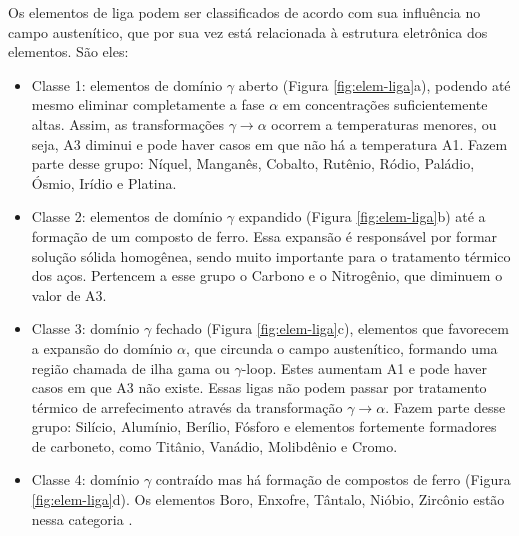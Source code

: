 \documentclass[brazil,tf,epusp]{usp}  %
\begin{document}

Os elementos de liga podem ser classificados de acordo com sua influência no campo austenítico, que por sua vez está relacionada à estrutura eletrônica dos elementos. São eles:

\begin{itemize}
  \item Classe 1: elementos de domínio $\gamma$ aberto (Figura \ref{fig:elem-liga}a), podendo até mesmo eliminar completamente a fase $\alpha$ em concentrações suficientemente altas. Assim, as transformações $\gamma \rightarrow  \alpha$ ocorrem a temperaturas menores, ou seja, A3 diminui e pode haver casos em que não há a temperatura A1. Fazem parte desse grupo: Níquel, Manganês, Cobalto, Rutênio, Ródio, Paládio, Ósmio, Irídio e Platina.

  \item Classe 2: elementos de domínio $\gamma$ expandido (Figura \ref{fig:elem-liga}b) até a formação de um composto de ferro. Essa expansão é responsável por formar solução sólida homogênea, sendo muito importante para o tratamento térmico dos aços. Pertencem a esse grupo o Carbono e o Nitrogênio, que diminuem o valor de A3.

  \item Classe 3: domínio $\gamma$ fechado (Figura \ref{fig:elem-liga}c), elementos que favorecem a expansão do domínio $\alpha$, que circunda o campo austenítico, formando uma região chamada de ilha gama ou $\gamma$-loop. Estes aumentam A1 e pode haver casos em que A3 não existe. Essas ligas não podem passar por tratamento térmico de arrefecimento através da transformação $\gamma \rightarrow \alpha$. Fazem parte desse grupo: Silício, Alumínio, Berílio, Fósforo e elementos fortemente formadores de carboneto, como Titânio, Vanádio, Molibdênio e Cromo.

  \item Classe 4: domínio $\gamma$ contraído mas há formação de compostos de ferro (Figura \ref{fig:elem-liga}d). Os elementos Boro, Enxofre, Tântalo, Nióbio, Zircônio estão nessa categoria \cite{Honeycombe1982} \cite{Silva2010}.
\end{itemize}
\end{document}
